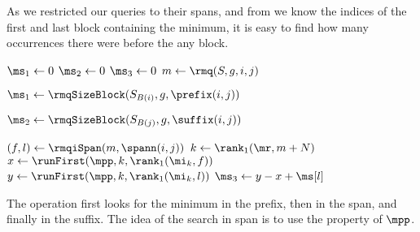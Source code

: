 \bigbreak

As we restricted our queries to their spans, and from \rmqiSpan{} we know the indices of the first and last block containing the minimum, it is easy to find how many occurrences there were before the any block.

\begin{algorithm}
\begin{algorithmic}
	\State $\ms_1 \gets 0$%
	\Instr $\ms_2 \gets 0$%
	\Instr $\ms_3 \gets 0$
	\State $m \gets \rmq(S, g, i, j)$
	
	 
		\State $\ms_1 \gets \rmqSizeBlock(S_{B(i)}, g, \prefix(i, j))$
	\EndIf
	
	 
		\State $\ms_2 \gets \rmqSizeBlock(S_{B(j)}, g, \suffix(i, j))$
	\EndIf

	\State $(f, l) \gets \rmqiSpan(m, \spann(i, j))$
	 
		\State $k \gets \rank_1(\mr, m + N)$ 
		\State $x \gets \runFirst(\mpp, k, \rank_1(\mi_k, f))$ 
		\State $y \gets \runFirst(\mpp, k, \rank_1(\mi_k, l))$ 
		\State $\ms_3 \gets y - x + \ms[l]$
	\EndIf
	\State {}
\EndFunction
\end{algorithmic}
\end{algorithm}

The operation \rmqSelect{} first looks for the minimum in the prefix, then in the span, and finally in the suffix.
The idea of the search in span is to use the property of $\mpp$.

